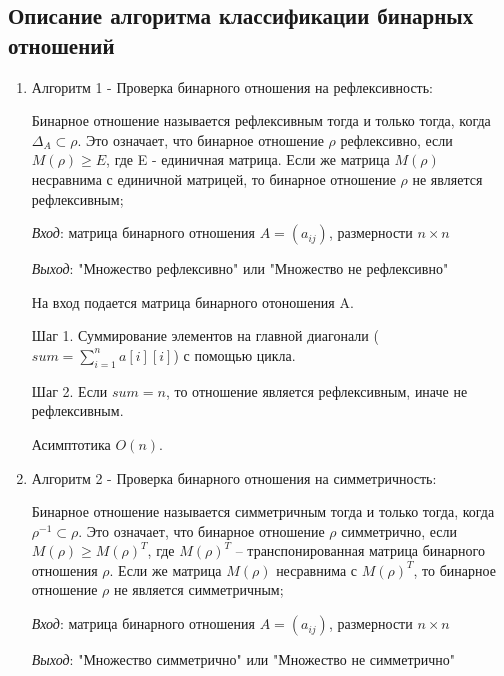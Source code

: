 \documentclass[spec, och, labwork]{shiza}
\begin{document}
        \subsection{Описание алгоритма классификации бинарных отношений}
            \begin{enumerate}

                \item Алгоритм 1 - Проверка бинарного отношения на рефлексивность:
                
                Бинарное отношение называется рефлексивным тогда и только тогда, когда $\Delta_A \subset \rho$. Это 
                означает, что бинарное отношение $\rho$ рефлексивно, если $M(\rho) \geq E$, где E - единичная матрица. 
                Если же матрица $M(\rho)$ несравнима с единичной матрицей, то бинарное отношение $\rho$ не является рефлексивным;

                \textit{Вход}: матрица бинарного отношения $A = (a_{ij})$, размерности $n \times n$

                \textit{Выход}: "Множество рефлексивно" или "Множество не рефлексивно"
                
                На вход подается матрица бинарного отоношения A.

                Шаг 1. Суммирование элементов на главной диагонали ($sum = \sum\limits_{i=1}^n a[i][i]$) с помощью цикла. 
                
                Шаг 2. Если $sum = n$, то отношение является рефлексивным, иначе не рефлексивным.

                Асимптотика $O(n)$.

                \item Алгоритм 2 - Проверка бинарного отношения на симметричность:
                
                Бинарное отношение называется симметричным тогда и только тогда, когда $\rho^{-1} \subset \rho$. Это означает, что бинарное 
                отношение $\rho$ симметрично, если $M(\rho) \geq M(\rho)^T$, где $M(\rho)^T$ – транспонированная матрица 
                бинарного отношения $\rho$. Если же матрица $M(\rho)$ несравнима с $M(\rho)^T$, то бинарное отношение $\rho$
                не является симметричным;
                
                \textit{Вход}: матрица бинарного отношения $A = (a_{ij})$, размерности $n \times n$

                \textit{Выход}: "Множество симметрично" или "Множество не симметрично"


\end{enumerate}
\end{document}
